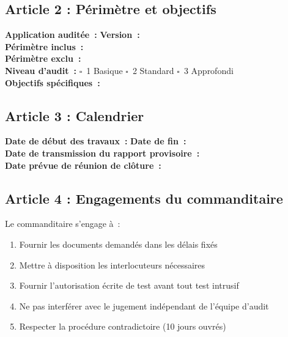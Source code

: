 \documentclass[12pt,a4paper,oneside]{report}
\begin{document}
\subsection*{Article 2 : P\'erim\`etre et objectifs}

\begin{encadre}
\textbf{Application audit\'ee~:} \dotfill \quad \textbf{Version~:} \dotfill \\[4pt]
\textbf{P\'erim\`etre inclus~:} \dotfill \\[4pt]
\textbf{P\'erim\`etre exclu~:} \dotfill \\[4pt]
\textbf{Niveau d'audit~:} $\square$~1 Basique \quad $\square$~2 Standard \quad $\square$~3 Approfondi \\[4pt]
\textbf{Objectifs sp\'ecifiques~:} \dotfill
\end{encadre}

\subsection*{Article 3 : Calendrier}

\begin{encadre}
\textbf{Date de d\'ebut des travaux~:} \dotfill \quad \textbf{Date de fin~:} \dotfill \\[4pt]
\textbf{Date de transmission du rapport provisoire~:} \dotfill \\[4pt]
\textbf{Date pr\'evue de r\'eunion de cl\^oture~:} \dotfill
\end{encadre}

\subsection*{Article 4 : Engagements du commanditaire}

\begin{encadre}
Le commanditaire s'engage \`a~:
\begin{enumerate}[leftmargin=*, itemsep=3pt]
\item Fournir les documents demand\'es dans les d\'elais fix\'es
\item Mettre \`a disposition les interlocuteurs n\'ecessaires
\item Fournir l'autorisation \'ecrite de test avant tout test intrusif
\item Ne pas interf\'erer avec le jugement ind\'ependant de l'\'equipe d'audit
\item Respecter la proc\'edure contradictoire (10 jours ouvr\'es)
\end{enumerate}
\end{encadre}
\end{document}
